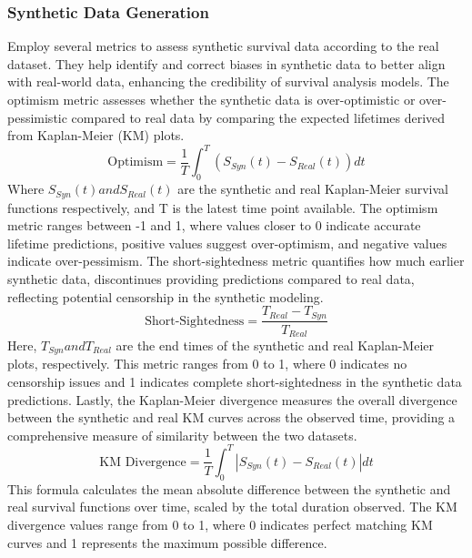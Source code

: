 \subsubsection{Synthetic Data Generation}
\noindent \parencite{norcliffe_survivalgan_2023} Employ several metrics to assess synthetic survival data according to the real dataset. They help identify and correct biases in synthetic data to better align with real-world data, enhancing the credibility of survival analysis models. The optimism metric assesses whether the synthetic data is over-optimistic or over-pessimistic compared to real data by comparing the expected lifetimes derived from Kaplan-Meier (KM) plots.
\begin{equation} \label{eq:optimisim}\text{Optimism} = \frac{1}{T} \int_{0}^{T}(S_{Syn}(t)-S_{Real}(t))dt\end{equation}
\noindent Where \(S_{Syn}(t) and S_{Real}(t)\) are the synthetic and real Kaplan-Meier survival functions respectively, and T is the latest time point available. The optimism metric ranges between -1 and 1, where values closer to 0 indicate accurate lifetime predictions, positive values suggest over-optimism, and negative values indicate over-pessimism. The short-sightedness metric quantifies how much earlier synthetic data, discontinues providing predictions compared to real data, reflecting potential censorship in the synthetic modeling.
\begin{equation} \label{eq:ssmetric}\text{Short-Sightedness} = \frac{T_{Real}-T_{Syn}}{T_{Real}}\end{equation}
\noindent Here, \(T_{Syn} and T_{Real}\) are the end times of the synthetic and real Kaplan-Meier plots, respectively. This metric ranges from 0 to 1, where 0 indicates no censorship issues and 1 indicates complete short-sightedness in the synthetic data predictions. Lastly, the Kaplan-Meier divergence measures the overall divergence between the synthetic and real KM curves across the observed time, providing a comprehensive measure of similarity between the two datasets.
\begin{equation} \label{eq:kmdiverge}\text{KM Divergence} = \frac{1}{T}\int_{0}^{T}|S_{Syn}(t)-S_{Real}(t)|dt\end{equation}
\noindent This formula calculates the mean absolute difference between the synthetic and real survival functions over time, scaled by the total duration observed. The KM divergence values range from 0 to 1, where 0 indicates perfect matching KM curves and 1 represents the maximum possible difference.

